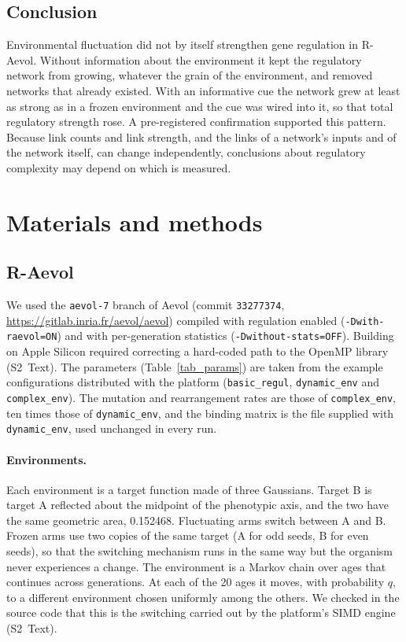 \documentclass[10pt,letterpaper]{article}
\begin{document}
\subsection*{Conclusion}

Environmental fluctuation did not by itself strengthen gene regulation in
R-Aevol. Without information about the environment it kept the regulatory
network from growing, whatever the grain of the environment, and removed
networks that already existed. With an informative
cue the network grew at least as strong as in a frozen environment and the cue
was wired into it, so that total
regulatory strength rose. A pre-registered confirmation supported this pattern. Because link counts and link strength, and the links of a
network's inputs and of the network itself, can change independently,
conclusions about regulatory complexity may depend on which is measured.

\section*{Materials and methods}

\subsection*{R-Aevol}
We used the \texttt{aevol-7} branch of Aevol (commit \texttt{33277374},
\url{https://gitlab.inria.fr/aevol/aevol}) compiled with regulation enabled
(\texttt{-Dwith-raevol=ON}) and with per-generation statistics
(\texttt{-Dwithout-stats=OFF}). Building on Apple Silicon required correcting a
hard-coded path to the OpenMP library (S2~Text). The parameters (Table~\ref{tab_params})
are taken from the example configurations distributed with the platform
(\texttt{basic\_regul}, \texttt{dynamic\_env} and \texttt{complex\_env}). The
mutation and rearrangement rates are those of \texttt{complex\_env}, ten times
those of \texttt{dynamic\_env}, and the binding matrix is the file supplied with
\texttt{dynamic\_env}, used unchanged in every run.

\paragraph*{Environments.} Each environment is a target function made of three
Gaussians. Target B is target A reflected about the midpoint of the phenotypic
axis, and the two have the same geometric area, 0.152468. Fluctuating arms switch between
A and B. Frozen arms use two copies of the same target (A for odd seeds, B for
even seeds), so that the switching mechanism runs in the same way but the
organism never experiences a change. The environment is a Markov chain over ages
that continues across generations. At each of the 20 ages it moves, with
probability $q$, to a different environment chosen uniformly among the others.
We checked in the source code that this is the switching carried out by the
platform's SIMD engine (S2~Text).
\end{document}
